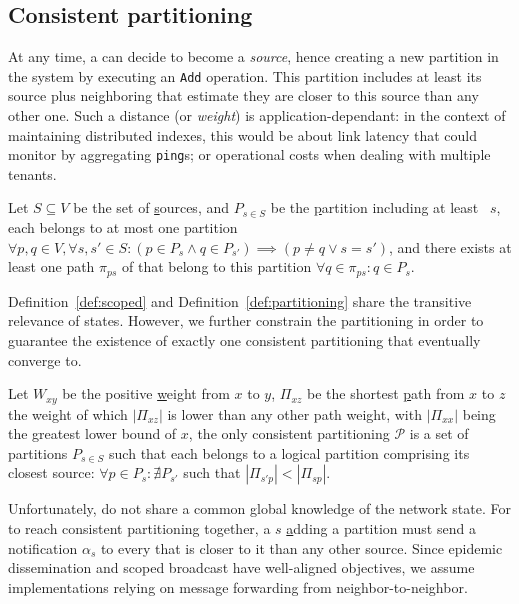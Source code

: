 

\subsection{Consistent partitioning}
\label{subsec:consistent}

At any time, a \process can decide to become a \emph{source}, hence
creating a new partition in the system by executing an \texttt{Add}
operation. This partition includes at least its source plus
neighboring \processes that estimate they are closer to this source
than any other one. Such a distance (or \emph{weight}) is
application-dependant: in the context of maintaining distributed
indexes, this would be about link latency that \nodes could monitor by
aggregating \texttt{ping}s; or operational costs when dealing with
multiple tenants.

\begin{definition}
  Let $S \subseteq V$ be the set of \underline{s}ources, and $P_{s\in
    S}$ be the \underline{p}artition including at least \Process~$s$,
  each \process belongs to at most one partition $\forall p,q \in V,
  \forall s,s' \in S: (p \in P_{s} \wedge q \in P_{s'}) \implies (p \neq
  q \vee s = s')$, and there exists at least one path $\pi_{ps}$ of
  \processes that belong to this partition $\forall q \in \pi_{ps}: q
  \in P_s$.
\end{definition}

Definition~\ref{def:scoped} and Definition~\ref{def:partitioning}
share the transitive relevance of \process states. However, we further
constrain the partitioning in order to guarantee the existence of
exactly one consistent partitioning that \processes eventually converge
to.

\begin{definition}
  Let $W_{xy}$ be the positive \underline{w}eight from $x$ to $y$,
  $\Pi_{xz}$ be the shortest \underline{p}ath from $x$ to $z$ the
  weight of which $|\Pi_{xz}|$ is lower than any other path weight,
  with $|\Pi_{xx}|$ being the greatest lower bound of $x$, the only
  consistent partitioning $\mathcal{P}$ is a set of partitions
  $P_{s\in S}$ such that each \process belongs to a logical partition
  comprising its closest source: $\forall p \in P_{s}: \nexists
  P_{s'}$ such that $|\Pi_{s'p}| < |\Pi_{sp}|$.
\end{definition}

Unfortunately, \processes do not share a common global knowledge of
the network state. For \processes to reach consistent partitioning
together, a \Process $s$ \underline{a}dding a partition must send a
notification $\alpha_s$ to every \process that is closer to it than
any other source. Since epidemic dissemination and scoped broadcast
have well-aligned objectives, we assume implementations relying on
message forwarding from neighbor-to-neighbor.


